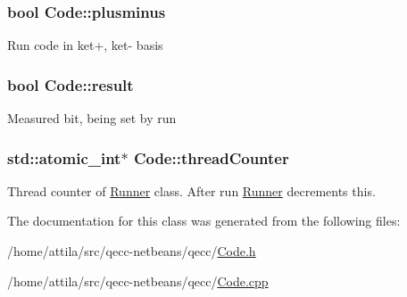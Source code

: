 \subsubsection[{\texorpdfstring{plusminus}{plusminus}}]{\setlength{\rightskip}{0pt plus 5cm}bool Code\+::plusminus\hspace{0.3cm}{\ttfamily [protected]}}\hypertarget{class_code_abd650233920e3b6778032b7d58282976}{}\label{class_code_abd650233920e3b6778032b7d58282976}
Run code in ket+, ket-\/ basis 
\subsubsection[{\texorpdfstring{result}{result}}]{\setlength{\rightskip}{0pt plus 5cm}bool Code\+::result\hspace{0.3cm}{\ttfamily [protected]}}\hypertarget{class_code_ac65cd5a89311ea1059ba7d3772d812f9}{}\label{class_code_ac65cd5a89311ea1059ba7d3772d812f9}
Measured bit, being set by run 
\subsubsection[{\texorpdfstring{thread\+Counter}{threadCounter}}]{\setlength{\rightskip}{0pt plus 5cm}std\+::atomic\+\_\+int$\ast$ Code\+::thread\+Counter}\hypertarget{class_code_a3c6a29ddf07c39bda3e78d05cada42b5}{}\label{class_code_a3c6a29ddf07c39bda3e78d05cada42b5}
Thread counter of \hyperlink{class_runner}{Runner} class. After run \hyperlink{class_runner}{Runner} decrements this. 

The documentation for this class was generated from the following files\+:\begin{DoxyCompactItemize}
\item 
/home/attila/src/qecc-\/netbeans/qecc/\hyperlink{_code_8h}{Code.\+h}\item 
/home/attila/src/qecc-\/netbeans/qecc/\hyperlink{_code_8cpp}{Code.\+cpp}\end{DoxyCompactItemize}
